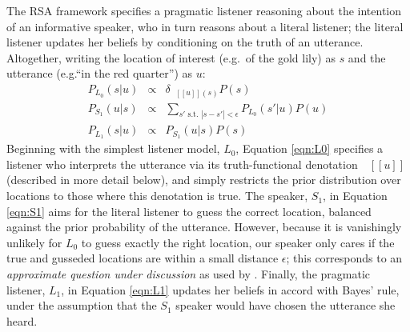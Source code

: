 \documentclass[10pt,letterpaper]{article}
\newcommand{\denote}[1]{\mbox{ $[\![ #1 ]\!]$}}
\begin{document}
The RSA framework specifies a pragmatic listener reasoning about the intention of an informative speaker, who in turn reasons about a literal listener; the literal listener updates her beliefs by conditioning on the truth of an utterance.
Altogether, writing the location of interest (e.g.~of the gold lily) as $s$ and the utterance (e.g.``in the red quarter'') as $u$:
\begin{eqnarray}
P_{L_0}(s|u)&\propto& \delta_{\denote{u}(s)} P(s)\label{eqn:L0}\\
P_{S_1}(u|s)&\propto&\sum_{s' \text{ s.t. } |s-s'|<\epsilon} P_{L_0}(s'|u) P(u)\label{eqn:S1}\\
P_{L_1}(s|u)&\propto&P_{S_1}(u | s) P(s) \label{eqn:L1}
\end{eqnarray}
Beginning with the simplest listener model, $L_0$, Equation \ref{eqn:L0} specifies a listener who interprets the utterance via its truth-functional denotation $\denote{u}$ (described in more detail below), and simply restricts the prior distribution over locations to those where this denotation is true.
The speaker, $S_1$, in Equation \ref{eqn:S1} aims for the literal listener to guess the correct location, balanced against the prior probability of the utterance. However, because it is vanishingly unlikely for $L_0$ to guess exactly the right location, our speaker only cares if the true and gusseded locations are within a small distance $\epsilon$; this corresponds to an \emph{approximate question under discussion} as used by .
Finally, the pragmatic listener, $L_1$, in Equation \ref{eqn:L1} updates her beliefs in accord with Bayes' rule, under the assumption that the $S_1$ speaker would have chosen the utterance she heard.
\end{document}
